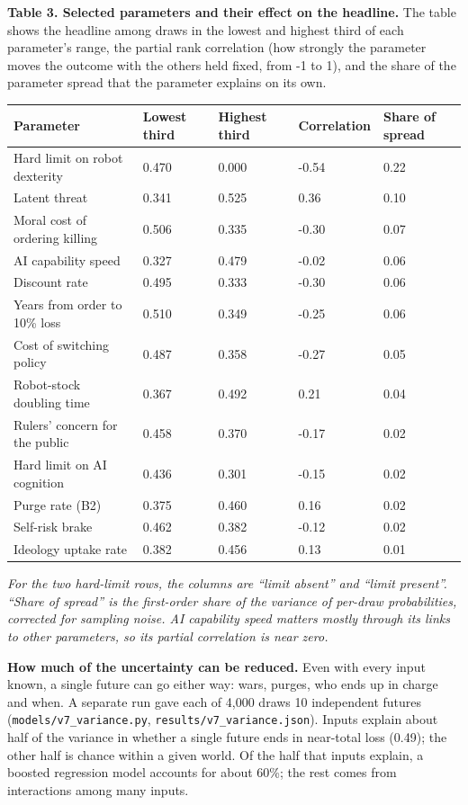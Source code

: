 \documentclass[
  10pt,
]{article}
\newcounter{none} %
\begin{document}
\textbf{Table 3. Selected parameters and their effect on the headline.} The table shows the headline
among draws in the lowest and highest third of each parameter's range, the partial rank correlation
(how strongly the parameter moves the outcome with the others held fixed, from -1 to 1), and the
share of the parameter spread that the parameter explains on its own.

{\def\LTcaptype{none} %
\begin{longtable}[]{@{}lllll@{}}
\toprule\noalign{}
Parameter & Lowest third & Highest third & Correlation & Share of spread \\
\midrule\noalign{}
\endhead
\bottomrule\noalign{}
\endlastfoot
Hard limit on robot dexterity & 0.470 & 0.000 & -0.54 & 0.22 \\
Latent threat & 0.341 & 0.525 & 0.36 & 0.10 \\
Moral cost of ordering killing & 0.506 & 0.335 & -0.30 & 0.07 \\
AI capability speed & 0.327 & 0.479 & -0.02 & 0.06 \\
Discount rate & 0.495 & 0.333 & -0.30 & 0.06 \\
Years from order to 10\% loss & 0.510 & 0.349 & -0.25 & 0.06 \\
Cost of switching policy & 0.487 & 0.358 & -0.27 & 0.05 \\
Robot-stock doubling time & 0.367 & 0.492 & 0.21 & 0.04 \\
Rulers' concern for the public & 0.458 & 0.370 & -0.17 & 0.02 \\
Hard limit on AI cognition & 0.436 & 0.301 & -0.15 & 0.02 \\
Purge rate (B2) & 0.375 & 0.460 & 0.16 & 0.02 \\
Self-risk brake & 0.462 & 0.382 & -0.12 & 0.02 \\
Ideology uptake rate & 0.382 & 0.456 & 0.13 & 0.01 \\
\end{longtable}
}

\emph{For the two hard-limit rows, the columns are ``limit absent'' and ``limit present''. ``Share
of spread'' is the first-order share of the variance of per-draw probabilities, corrected for
sampling noise. AI capability speed matters mostly through its links to other parameters, so its
partial correlation is near zero.}

\textbf{How much of the uncertainty can be reduced.} Even with every input known, a single future
can go either way: wars, purges, who ends up in charge and when. A separate run gave each of 4,000
draws 10 independent futures (\texttt{models/v7\_variance.py}, \texttt{results/v7\_variance.json}).
Inputs explain about half of the variance in whether a single future ends in near-total loss (0.49);
the other half is chance within a given world. Of the half that inputs explain, a boosted regression
model accounts for about 60\%; the rest comes from interactions among many inputs.
\end{document}

